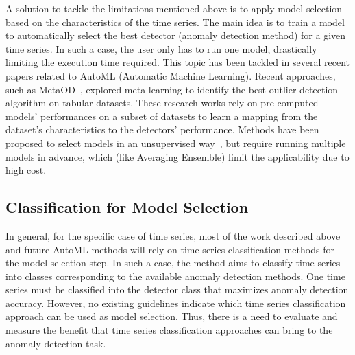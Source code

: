 A solution to tackle the limitations mentioned above is to apply model selection based on the characteristics of the time series. The main idea is to train a model to automatically select the best detector (anomaly detection method) for a given time series. In such a case, the user only has to run one model, drastically limiting the execution time required. This topic has been tackled in several recent papers related to AutoML (Automatic Machine Learning). Recent approaches, such as MetaOD~\cite{NEURIPS2021_23c89427,https://doi.org/10.48550/arxiv.2009.04395}, explored meta-learning to identify the best outlier detection algorithm on tabular datasets. 
These research works rely on pre-computed models' performances on a subset of datasets to learn a mapping from the dataset's characteristics to the detectors' performance. Methods have been proposed to select models in an unsupervised way~\cite{https://doi.org/10.48550/arxiv.2210.01078}, but require running multiple models in advance, which (like Averaging Ensemble) limit the applicability due to high cost. 

\subsection{Classification for Model Selection}

In general, for the specific case of time series, most of the work described above and future AutoML methods will rely on time series classification methods for the model selection step. In such a case, the method aims to classify time series into classes corresponding to the available anomaly detection methods. One time series must be classified into the detector class that maximizes anomaly detection accuracy. However, no existing guidelines indicate which time series classification approach can be used as model selection. Thus, there is a need to evaluate and measure the benefit that time series classification approaches can bring to the anomaly detection task.

